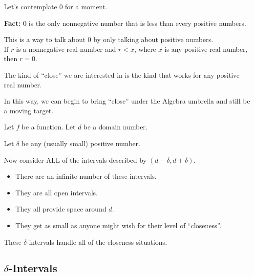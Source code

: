 \documentclass{ximera}
\begin{document}
Let's contemplate $0$ for a moment. \\

\begin{fact}


\textbf{Fact:} $0$ is the only nonnegative number that is less than every positive numbers.


\end{fact}

This is a way to talk about $0$ by only talking about positive numbers. \\



If $r$ is a nonnegative real number and $r < x$, where $x$ is any positive real number, then $r = 0$.







\begin{idea}


The kind of ``close'' we are interested in is the kind that works for any positive real number.


\end{idea}






In this way, we can begin to bring ``close'' under the Algebra umbrella and still be a moving target.


Let $f$ be a function. Let $d$ be a domain number.

Let $\delta$ be any (usually small) positive number.

Now consider ALL of the intervals described by $(d - \delta, d + \delta)$.


\begin{itemize}
\item There are an infinite number of these intervals.
\item They are all open intervals.
\item They all provide space around $d$.
\item They get as small as anyone might wish for their level of ``closeness''.
\end{itemize}

These $\delta$-intervals handle all of the closeness situations.










\subsection{$\delta$-Intervals}
\end{document}
